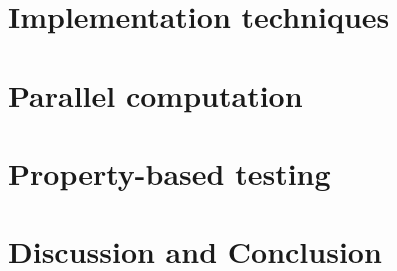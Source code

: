 \documentclass[oneside]{book}
\begin{document}
\epigraphhead[450]{}
\part{Implementation techniques}
\label{part:implementation}



\epigraphhead[450]{}
\part{Parallel computation}
\label{part:parallel}


\epigraphhead[450]{}
\part{Property-based testing}
\label{part:property}


\epigraphhead[450]{}
\part{Discussion and Conclusion}
\label{part:discussion}



\renewcommand\bibname{References}



\end{document}
